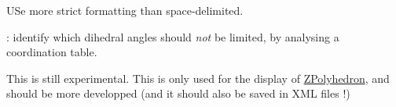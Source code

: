 \begin{DoxyRefList}
\item[Member \mbox{\hyperlink{class_obj_cryst_1_1_z_scatterer_a551fabc1d57cab02e957946dcfa1aae7}{Obj\+Cryst::Z\+Scatterer::Export\+Fenske\+Hall\+Z\+Matrix}} (ostream \&os)]\label{todo__todo000017}%
%
U\+Se more strict formatting than space-\/delimited.  
\item[Member \mbox{\hyperlink{class_obj_cryst_1_1_z_scatterer_a097d27206e6e54259bb987a06d65f71c}{Obj\+Cryst::Z\+Scatterer::Import\+Fenske\+Hall\+Z\+Matrix}} (istream \&is, bool named=false)]\label{todo__todo000016}%
%
\+: identify which dihedral angles should {\itshape not} be limited, by analysing a coordination table.  
\item[Member \mbox{\hyperlink{class_obj_cryst_1_1_z_scatterer_aa02e92087f85784a74d1bdcebf178da9}{Obj\+Cryst::Z\+Scatterer::m3\+D\+Display\+Index}} ]\label{todo__todo000018}%
%
This is still experimental. This is only used for the display of \mbox{\hyperlink{class_obj_cryst_1_1_z_polyhedron}{Z\+Polyhedron}}, and should be more developped (and it should also be saved in X\+ML files !) 
\end{DoxyRefList}